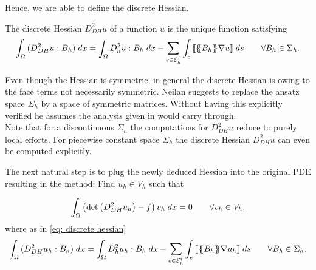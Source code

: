 Hence, we are able to define the discrete Hessian.
\begin{definition} \label{def: discrete Hessian}
	The discrete Hessian $D_{DH}^2 u$ of a function $u$ is the unique function satisfying
	\begin{align}
		\int_{\Omega} {{ (D_{DH}^2 u : B_h) }\;dx}
		= \int_{\Omega} {{ D^2_h u: B_h}\;dx}
			 -\sum_{ e \in \mathcal{E}_h^i} \int_{e} {{  \llbracket \{\!\!\{ B_h \}\!\!\} \nabla u  \rrbracket}\;ds}\qquad \forall B_h \in \Sigma_h. \label{eq: discrete hessian}
	\end{align}
\end{definition}

Even though the Hessian is symmetric, in general the discrete Hessian is owing to the face terms not necessarily symmetric. Neilan suggests to replace the ansatz space $\Sigma_h$ by a space of symmetric matrices. Without having this explicitly verified he assumes the analysis given in \cite{Neilan2014} would carry through.\\
Note that for a discontinuous $\Sigma_h$ the computations for $D_{DH}^2 u$ reduce to purely local efforts. For piecewise constant space $\Sigma_h$ the discrete Hessian $D_{DH}^2 u$ can even be computed explicitly.

The next natural step is to plug the newly deduced Hessian into the original \MA PDE resulting in the method: Find $u_h \in V_h$ such that

\begin{align}
		\int_{\Omega} {{ \left(\det{\left(D_{DH}^2 u_h\right)} - f \right) v_h}\;dx} = 0 \qquad \forall v_h \in V_h, \label{eq: neilan eq1}
\end{align}
where as in \eqref{eq: discrete hessian}
	\begin{align*}
		\int_{\Omega} {{ (D_{DH}^2 u_h : B_h) }\;dx}
		= \int_{\Omega} {{ D^2_h u_h: B_h}\;dx}
			 -\sum_{ e \in \mathcal{E}_h^i} \int_{e} {{  \llbracket \{\!\!\{ B_h \}\!\!\} \nabla u_h  \rrbracket}\;ds}\qquad \forall B_h \in \Sigma_h.
	\end{align*}

